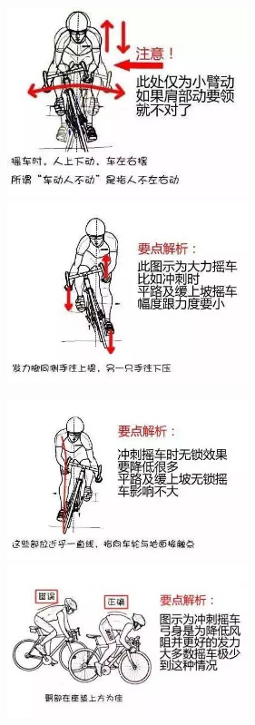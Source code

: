 \documentclass{ctexbook}
\begin{document}
\begin{figure}[ht]
\centering
\includegraphics[width=7cm]{fig/摇车1}
\hspace{10pt}  %
\includegraphics[width=7cm]{fig/摇车2}
\end{figure}

\begin{figure}[ht]
\centering
\includegraphics[width=7cm]{fig/摇车3}
\hspace{10pt}  %
\includegraphics[width=7cm]{fig/摇车4}
\end{figure}
\end{document}
